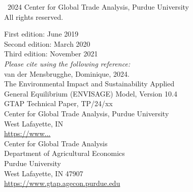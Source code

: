 \documentclass[11pt,letterpaper]{report}
\begin{document}

\normalsize
\clearpage


\pagestyle{empty}

\vspace*{2cm}
\footnotesize
\noindent \textcopyright \, 2024 Center for Global Trade Analysis, Purdue University \\
All rights reserved.

\vspace{3cm}
\noindent First edition: June 2019 \\
\noindent Second edition: March 2020 \\
\noindent Third edition: November 2021 \\

\vspace{4cm}
\noindent \emph{Please cite using the following reference:} \\
\hspace*{0.25cm} van der Mensbrugghe, Dominique, 2024. \\
\hspace*{0.5cm} The Environmental Impact and Sustainability Applied \\
\hspace*{0.5cm} General Equilibrium (ENVISAGE) Model, Version 10.4 \\
\hspace*{0.5cm} GTAP Technical Paper, TP/24/xx \\
\hspace*{0.5cm} Center for Global Trade Analysis, Purdue University \\
\hspace*{0.5cm} West Lafayette, IN \\
\hspace*{0.5cm} \url{https://www...} \\

\vspace{2cm}
\noindent Center for Global Trade Analysis \\
Department of Agricultural Economics \\
Purdue University \\
West Lafayette, IN 47907 \\
\url{https://www.gtap.agecon.purdue.edu} \\
\clearpage
\end{document}

